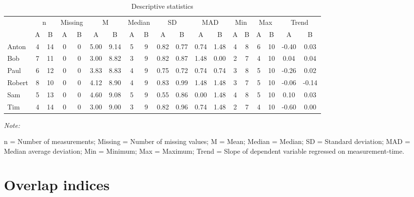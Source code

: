 \documentclass[
]{book}
\begin{document}
\begin{table}

\caption{\label{tab:unnamed-chunk-65}Descriptive statistics}
\centering
\begin{threeparttable}
\begin{tabular}[t]{lcccccccccccccccccc}
\toprule
\multicolumn{1}{c}{ } & \multicolumn{2}{c}{n} & \multicolumn{2}{c}{Missing} & \multicolumn{2}{c}{M} & \multicolumn{2}{c}{Median} & \multicolumn{2}{c}{SD} & \multicolumn{2}{c}{MAD} & \multicolumn{2}{c}{Min} & \multicolumn{2}{c}{Max} & \multicolumn{2}{c}{Trend} \\
\cmidrule(l{3pt}r{3pt}){2-3} \cmidrule(l{3pt}r{3pt}){4-5} \cmidrule(l{3pt}r{3pt}){6-7} \cmidrule(l{3pt}r{3pt}){8-9} \cmidrule(l{3pt}r{3pt}){10-11} \cmidrule(l{3pt}r{3pt}){12-13} \cmidrule(l{3pt}r{3pt}){14-15} \cmidrule(l{3pt}r{3pt}){16-17} \cmidrule(l{3pt}r{3pt}){18-19}
  & A & B & A & B & A & B & A & B & A & B & A & B & A & B & A & B & A & B\\
\midrule
Anton & 4 & 14 & 0 & 0 & 5.00 & 9.14 & 5 & 9 & 0.82 & 0.77 & 0.74 & 1.48 & 4 & 8 & 6 & 10 & -0.40 & 0.03\\
Bob & 7 & 11 & 0 & 0 & 3.00 & 8.82 & 3 & 9 & 0.82 & 0.87 & 1.48 & 0.00 & 2 & 7 & 4 & 10 & 0.04 & 0.04\\
Paul & 6 & 12 & 0 & 0 & 3.83 & 8.83 & 4 & 9 & 0.75 & 0.72 & 0.74 & 0.74 & 3 & 8 & 5 & 10 & -0.26 & 0.02\\
Robert & 8 & 10 & 0 & 0 & 4.12 & 8.90 & 4 & 9 & 0.83 & 0.99 & 1.48 & 1.48 & 3 & 7 & 5 & 10 & -0.06 & -0.14\\
Sam & 5 & 13 & 0 & 0 & 4.60 & 9.08 & 5 & 9 & 0.55 & 0.86 & 0.00 & 1.48 & 4 & 8 & 5 & 10 & 0.10 & 0.03\\
Tim & 4 & 14 & 0 & 0 & 3.00 & 9.00 & 3 & 9 & 0.82 & 0.96 & 0.74 & 1.48 & 2 & 7 & 4 & 10 & -0.60 & 0.00\\
\bottomrule
\end{tabular}
\begin{tablenotes}
\item \textit{Note: } 
\item n = Number of measurements; Missing = Number of missing values; M = Mean; Median = Median; SD = Standard deviation; MAD = Median average deviation; Min = Minimum; Max = Maximum; Trend = Slope of dependent variable regressed on measurement-time.
\end{tablenotes}
\end{threeparttable}
\end{table}

\hypertarget{overlap-indices}{%
\section{Overlap indices}\label{overlap-indices}}
\end{document}
